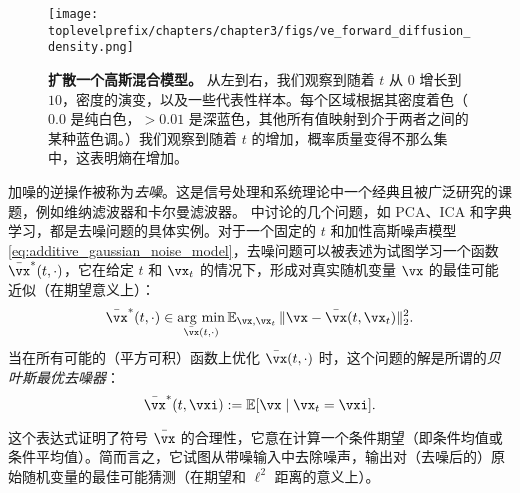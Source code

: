 \documentclass[../../book-main.tex]{subfiles}
\begin{document}
\begin{figure}
	\texttt{[image: \\toplevelprefix/chapters/chapter3/figs/ve\_forward\_diffusion\_density.png]}
	\caption{\small\textbf{扩散一个高斯混合模型。} 从左到右，我们观察到随着 \(t\) 从 \(0\) 增长到 \(10\)，密度的演变，以及一些代表性样本。每个区域根据其密度着色（\(0.0\) 是纯白色，\(> 0.01\) 是深蓝色，其他所有值映射到介于两者之间的某种蓝色调。）我们观察到随着 \(t\) 的增加，概率质量变得不那么集中，这表明熵在增加。}
	\label{fig:ve_forward_density}
\end{figure}

加噪的逆操作被称为\textit{去噪}。这是信号处理和系统理论中一个经典且被广泛研究的课题，例如维纳滤波器和卡尔曼滤波器。 中讨论的几个问题，如 PCA、ICA 和字典学习，都是去噪问题的具体实例。对于一个固定的 \(t\) 和加性高斯噪声模型 \eqref{eq:additive_gaussian_noise_model}，去噪问题可以被表述为试图学习一个函数 \(\bar{\vx}^{\ast}(t, \cdot)\)，它在给定 \(t\) 和 \(\vx_{t}\) 的情况下，形成对真实随机变量 \(\vx\) 的最佳可能近似（在期望意义上）：
\begin{equation}\label{eq:denoising_loss}
	\bar{\vx}^{\ast}(t, \cdot) \in \argmin_{\bar{\vx}(t, \cdot)}\Ex_{\vx, \vx_{t}}\norm{\vx - \bar{\vx}(t, \vx_{t})}_{2}^{2}.
\end{equation}
当在所有可能的（平方可积）函数上优化 \(\bar{\vx}(t, \cdot)\) 时，这个问题的解是所谓的\textit{贝叶斯最优去噪器}：
\begin{equation}\label{eq:optimal_denoiser}
	\bar{\vx}^{\ast}(t, \vxi) := \Ex[\vx \mid \vx_{t} = \vxi].
\end{equation}

这个表达式证明了符号 \(\bar{\vx}\) 的合理性，它意在计算一个条件期望（即条件均值或条件平均值）。简而言之，它试图从带噪输入中去除噪声，输出对（去噪后的）原始随机变量的最佳可能猜测（在期望和 \(\ell^{2}\) 距离的意义上）。
\end{document}
